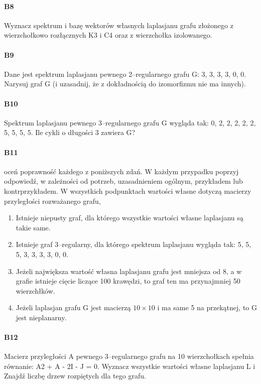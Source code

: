 \documentclass[a4paper,12pt]{article}
\theoremstyle{definition}%
\theoremstyle{definition}
\theoremstyle{problem}
\begin{document}
\paragraph{B8} Wyznacz spektrum i bazę wektorów własnych laplasjanu grafu złożonego z wierzchołkowo rozłącznych K3 i C4 oraz z wierzchołka izolowanego.

\paragraph{B9} Dane jest spektrum laplasjanu pewnego 2–regularnego grafu G: 3, 3, 3, 3, 0, 0. Narysuj graf G (i uzasadnij, że z dokładnością do izomorfizmu nie ma innych).

\paragraph{B10} Spektrum laplasjanu pewnego 3–regularnego grafu G wygląda tak: 0, 2, 2, 2, 2, 2, 5, 5, 5, 5. Ile cykli o długości 3 zawiera G?

\paragraph{B11} oceń poprawność każdego z poniższych zdań. W każdym przypadku poprzyj odpowiedź, w zależności od potrzeb, uzasadnieniem ogólnym, przykładem lub kontrprzykładem. W wszystkich podpunktach wartości własne dotyczą macierzy przyległości rozważanego grafu,
\begin{enumerate}[label=\alph*)]
\item  Istnieje niepusty graf, dla którego wszystkie wartości własne laplasjanu są takie same.
\item  Istnieje graf 3–regularny, dla którego spektrum laplasjanu wygląda tak: 5, 5, 5, 3, 3, 3, 3, 0, 0.
\item  Jeżeli największa wartość własna laplasjanu grafu jest mniejsza od 8, a w grafie istnieje cięcie liczące 100 krawędzi, to graf ten ma przynajmniej 50 wierzchłków.
\item  Jeżeli laplasjan grafu G jest macierzą $10 \times 10$ i ma same 5 na przekątnej, to G jest nieplanarny.
\end{enumerate}

\paragraph{B12} Macierz przyległości A pewnego 3–regularnego grafu na 10 wierzchołkach spełnia równanie: A2 + A - 2I - J = 0. Wyznacz wszystkie wartości własne laplasjanu L i Znajdź liczbę drzew rozpiętych dla tego grafu.
\end{document}

